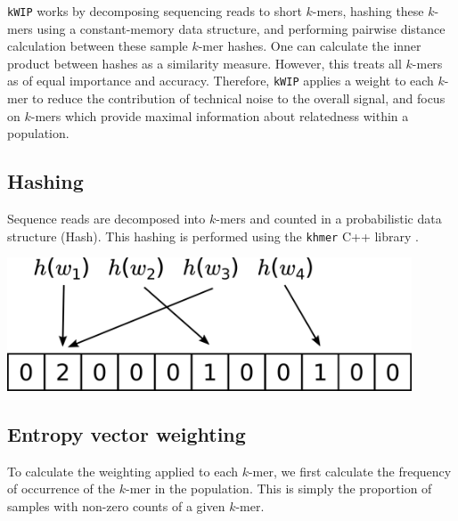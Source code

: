 \documentclass[a0,portrait]{a0poster}
\begin{document}
\begin{multicols}{2}
\texttt{kWIP} works by decomposing sequencing reads to short $k$-mers, hashing
these $k$-mers using a constant-memory data structure, and performing pairwise
distance calculation between these sample $k$-mer hashes. One can calculate
the inner product between hashes as a similarity measure. However, this treats
all $k$-mers as of equal importance and accuracy. Therefore, \texttt{kWIP}
applies a weight to each $k$-mer to reduce the contribution of technical noise
to the overall signal, and focus on $k$-mers which provide maximal information
about relatedness within a population.


\subsection*{Hashing}

Sequence reads are decomposed into $k$-mers and counted in a probabilistic
data structure (Hash). This hashing is performed using the \texttt{khmer} C++
library \cite{crusoe_khmer_2015}.

\begin{center}
  \vspace{1cm}
  \includegraphics[width=12cm]{hashing.png}
  \vspace{1cm}
\end{center}

\subsection*{Entropy vector weighting}

To calculate the weighting applied to each $k$-mer, we first calculate the
frequency of occurrence of the $k$-mer in the population. This is simply the
proportion of samples with non-zero counts of a given $k$-mer.


\end{multicols}
\end{document}
